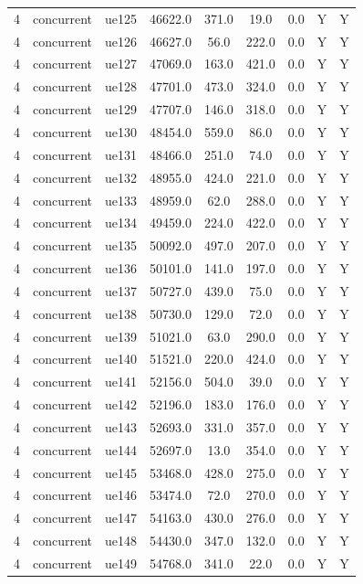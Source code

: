 \begin{table}[ht]
\begin{tabular}{|c|c|c|c|c|c|c|c|c|}
4 & concurrent & ue125 & 46622.0 & 371.0 & 19.0 & 0.0 & Y & Y \\
4 & concurrent & ue126 & 46627.0 & 56.0 & 222.0 & 0.0 & Y & Y \\
4 & concurrent & ue127 & 47069.0 & 163.0 & 421.0 & 0.0 & Y & Y \\
4 & concurrent & ue128 & 47701.0 & 473.0 & 324.0 & 0.0 & Y & Y \\
4 & concurrent & ue129 & 47707.0 & 146.0 & 318.0 & 0.0 & Y & Y \\
4 & concurrent & ue130 & 48454.0 & 559.0 & 86.0 & 0.0 & Y & Y \\
4 & concurrent & ue131 & 48466.0 & 251.0 & 74.0 & 0.0 & Y & Y \\
4 & concurrent & ue132 & 48955.0 & 424.0 & 221.0 & 0.0 & Y & Y \\
4 & concurrent & ue133 & 48959.0 & 62.0 & 288.0 & 0.0 & Y & Y \\
4 & concurrent & ue134 & 49459.0 & 224.0 & 422.0 & 0.0 & Y & Y \\
4 & concurrent & ue135 & 50092.0 & 497.0 & 207.0 & 0.0 & Y & Y \\
4 & concurrent & ue136 & 50101.0 & 141.0 & 197.0 & 0.0 & Y & Y \\
4 & concurrent & ue137 & 50727.0 & 439.0 & 75.0 & 0.0 & Y & Y \\
4 & concurrent & ue138 & 50730.0 & 129.0 & 72.0 & 0.0 & Y & Y \\
4 & concurrent & ue139 & 51021.0 & 63.0 & 290.0 & 0.0 & Y & Y \\
4 & concurrent & ue140 & 51521.0 & 220.0 & 424.0 & 0.0 & Y & Y \\
4 & concurrent & ue141 & 52156.0 & 504.0 & 39.0 & 0.0 & Y & Y \\
4 & concurrent & ue142 & 52196.0 & 183.0 & 176.0 & 0.0 & Y & Y \\
4 & concurrent & ue143 & 52693.0 & 331.0 & 357.0 & 0.0 & Y & Y \\
4 & concurrent & ue144 & 52697.0 & 13.0 & 354.0 & 0.0 & Y & Y \\
4 & concurrent & ue145 & 53468.0 & 428.0 & 275.0 & 0.0 & Y & Y \\
4 & concurrent & ue146 & 53474.0 & 72.0 & 270.0 & 0.0 & Y & Y \\
4 & concurrent & ue147 & 54163.0 & 430.0 & 276.0 & 0.0 & Y & Y \\
4 & concurrent & ue148 & 54430.0 & 347.0 & 132.0 & 0.0 & Y & Y \\
4 & concurrent & ue149 & 54768.0 & 341.0 & 22.0 & 0.0 & Y & Y \\

\end{tabular}
\end{table}
